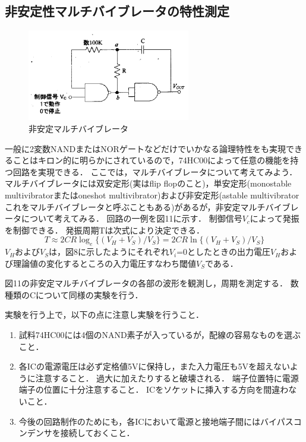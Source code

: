 \documentclass[10pt, a4j, dvipdfmx]{jarticle}
\begin{document}
\subsection{非安定性マルチバイブレータの特性測定}
\begin{figure}
 \vspace*{-\intextsep}
 \begin{center}
  \includegraphics[height=40mm]{実験テキスト/図11.png}
  \caption{非安定マルチバイブレータ}
  \label{fig:図11}
 \end{center}
\end{figure}
一般に2変数NANDまたはNORゲートなどだけでいかなる論理特性をも実現できることはキロン的に明らかにされているので，74HC00によって任意の機能を持つ回路を実現できる．
ここでは，マルチバイブレータについて考えてみよう．
マルチバイブレータには双安定形(実はflip flopのこと)，単安定形(monostable multivibratorまたはoneshot multivibrator)および非安定形(astable multivibrator これをマルチバイブレータと呼ぶこともある)があるが，非安定マルチバイブレータについて考えてみる．
回路の一例を図11に示す．
制御信号$V_c$によって発振を制御できる．
発振周期Tは次式により決定できる．
\begin{equation}
T \approx 2CR \log_e \{ (V_H + V_S) / V_S \} = 2CR \ln \{ (V_H + V_S) / V_S \}
\end{equation}
$V_H$および$V_S$は，図8に示したようにそれぞれ$V_i$=0としたときの出力電圧$V_H$および理論値の変化するところの入力電圧すなわち閾値$V_S$である．

図11の非安定マルチバイブレータの各部の波形を観測し，周期を測定する．
数種類のCについて同様の実験を行う．

実験を行う上で，以下の点に注意し実験を行うこと．
\begin{enumerate}
\item 試料74HC00には4個のNAND素子が入っているが，配線の容易なものを選ぶこと．
\item 各ICの電源電圧は必ず定格値5Vに保持し，また入力電圧も5Vを超えないように注意すること．
	過大に加えたりすると破壊される．
	端子位置特に電源端子の位置に十分注意すること．
	ICをソケットに挿入する方向を間違わないこと．
\item 今後の回路制作のためにも，各ICにおいて電源と接地端子間にはバイパスコンデンサを接続しておくこと．
\end{enumerate}
\end{document}
